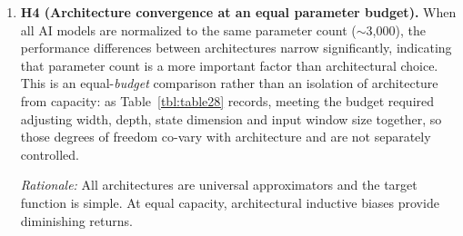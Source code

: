 \begin{enumerate}
\emph{Rationale:} The bias-variance analysis (Section \ref{sec:theoretical-basis-universal-approximation-and-denoising}) predicts that the low-complexity target function $f^*$ requires minimal model capacity. Excess capacity increases variance without reducing bias.

\item \textbf{H4 (Architecture convergence at an equal parameter budget).} When all AI models are normalized to the same parameter count ($\sim$3,000), the performance differences between architectures narrow significantly, indicating that parameter count is a more important factor than architectural choice. This is an equal-\emph{budget} comparison rather than an isolation of architecture from capacity: as Table~\ref{tbl:table28} records, meeting the budget required adjusting width, depth, state dimension and input window size together, so those degrees of freedom co-vary with architecture and are not separately controlled.

\emph{Rationale:} All architectures are universal approximators and the target function is simple. At equal capacity, architectural inductive biases provide diminishing returns.

\end{enumerate}

